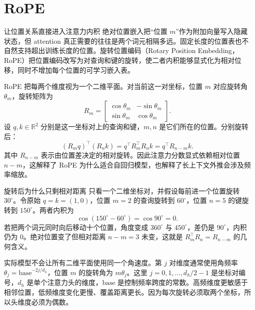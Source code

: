 \section{RoPE}
\label{sec:rope}

\figRoPE

\begin{motivationbox}{让位置关系直接进入注意力内积}
绝对位置嵌入把“位置 $m$”作为附加向量写入隐藏状态，但 attention 真正需要的往往是两个词元相隔多远。固定长度的位置表也不自然支持超出训练长度的位置。旋转位置编码（Rotary Position Embedding，RoPE）把位置编码改写为对查询和键的旋转，使二者内积能够显式化为相对位移，同时不增加每个位置的可学习嵌入表。
\end{motivationbox}

RoPE 把每两个维度视为一个二维平面。对当前这一对坐标，位置 $m$ 对应旋转角 $\theta_m$，旋转矩阵为
\[
R_m=\begin{bmatrix}\cos\theta_m&-\sin\theta_m\\ \sin\theta_m&\cos\theta_m\end{bmatrix}.
\]
设 $q,k\in\mathbb R^2$ 分别是这一坐标对上的查询和键，$m,n$ 是它们所在的位置。分别旋转后：
\[
(R_m q)^\top(R_n k)=q^\top R_m^\top R_n k=q^\top R_{n-m}k.
\]
其中 $R_{n-m}$ 表示由位置差决定的相对旋转。因此注意力分数显式依赖相对位置 $n-m$，这解释了 RoPE 为什么适合自回归模型，也解释了长上下文外推会涉及频率缩放。

\begin{examplebox}{旋转后为什么只剩相对距离}
只看一个二维坐标对，并假设每前进一个位置旋转 $30^\circ$。令原始 $q=k=(1,0)$，位置 $m=2$ 的查询旋转到 $60^\circ$，位置 $n=5$ 的键旋转到 $150^\circ$。两者内积为
\[
\cos(150^\circ-60^\circ)=\cos90^\circ=0.
\]
若把两个词元同时向后移动十个位置，角度变成 $360^\circ$ 与 $450^\circ$，差仍是 $90^\circ$，内积仍为 $0$。绝对位置变了但相对距离 $n-m=3$ 未变，这就是 $R_m^\top R_n=R_{n-m}$ 的几何含义。
\end{examplebox}

实际模型不会让所有二维平面使用同一个角速度。第 $j$ 对维度通常使用角频率 $\theta_j=\mathrm{base}^{-2j/d_h}$，位置 $m$ 的旋转角为 $m\theta_j$。这里 $j=0,1,\ldots,d_h/2-1$ 是坐标对编号，$d_h$ 是单个注意力头的维度，$\mathrm{base}$ 是控制频率跨度的常数。高频维度更敏感于相邻位置，低频维度变化更慢、覆盖距离更长。因为每次旋转必须取两个坐标，所以头维度必须为偶数。


